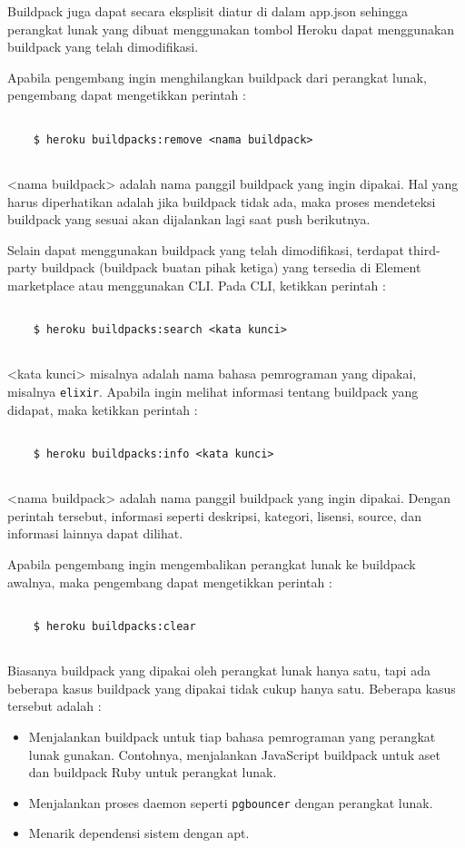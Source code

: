 Buildpack juga dapat secara eksplisit diatur di dalam app.json sehingga perangkat lunak yang dibuat menggunakan tombol Heroku dapat menggunakan buildpack yang telah dimodifikasi.

Apabila pengembang ingin menghilangkan buildpack dari perangkat lunak, pengembang dapat mengetikkan perintah :
\begin{lstlisting}

	$ heroku buildpacks:remove <nama buildpack>
	
\end{lstlisting}
<nama buildpack> adalah nama panggil buildpack yang ingin dipakai. Hal yang harus diperhatikan adalah jika buildpack tidak ada, maka proses mendeteksi buildpack yang sesuai akan dijalankan lagi saat push berikutnya.

Selain dapat menggunakan buildpack yang telah dimodifikasi, terdapat third-party buildpack (buildpack buatan pihak ketiga) yang tersedia di Element marketplace atau menggunakan CLI. Pada CLI, ketikkan perintah :
\begin{lstlisting}

	$ heroku buildpacks:search <kata kunci>
	
\end{lstlisting}
<kata kunci> misalnya adalah nama bahasa pemrograman yang dipakai, misalnya \texttt{elixir}. Apabila ingin melihat informasi tentang buildpack yang didapat, maka ketikkan perintah :
\begin{lstlisting}

	$ heroku buildpacks:info <kata kunci>
	
\end{lstlisting}
<nama buildpack> adalah nama panggil buildpack yang ingin dipakai. Dengan perintah tersebut, informasi seperti deskripsi, kategori, lisensi, source, dan informasi lainnya dapat dilihat.

Apabila pengembang ingin mengembalikan perangkat lunak ke buildpack awalnya, maka pengembang dapat mengetikkan perintah :
\begin{lstlisting}

	$ heroku buildpacks:clear
	
\end{lstlisting}

Biasanya buildpack yang dipakai oleh perangkat lunak hanya satu, tapi ada beberapa kasus buildpack yang dipakai tidak cukup hanya satu. Beberapa kasus tersebut adalah :
\begin{itemize}
\item Menjalankan buildpack untuk tiap bahasa pemrograman yang perangkat lunak gunakan. Contohnya, menjalankan JavaScript buildpack untuk aset dan buildpack Ruby untuk perangkat lunak.
\item Menjalankan proses daemon seperti \texttt{pgbouncer} dengan perangkat lunak.
\item Menarik dependensi sistem dengan apt.
\end{itemize}

